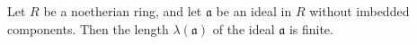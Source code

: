 Let $R$ be a noetherian ring, and let $\mathfrak{a}$ be an ideal in $R$ without imbedded components. Then the length $\lambda(\mathfrak{a})$ of the ideal $\mathfrak{a}$ is finite.
